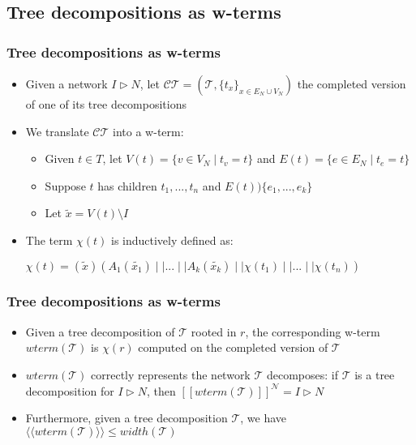 \documentclass{beamer}
\begin{document}
\subsection{Tree decompositions as w-terms}

\begin{frame}
\frametitle{Tree decompositions as w-terms}
	\begin{itemize}
		\item Given a network $I \triangleright N$, 
		let $\mathcal{CT} = (\mathcal{T}, \{ t_x \}_{x \in E_N \cup V_N})$ the completed
		version of one of its tree decompositions
	\medskip
		\item We translate $\mathcal{CT}$ into a w-term:
		\begin{itemize}
			\item Given $t \in T$, let $V(t) = \{ v \in V_N \mid t_v = t \}$ and 
			$E(t) = \{ e \in E_N \mid t_e = t \}$
			\item Suppose $t$ has children $t_1,...,t_n$ and $E(t) ) \{ e_1,...,e_k \}$
			\item Let $\widetilde{x} = V(t) \setminus I$
		\end{itemize}
	\medskip
		\item The term $\chi(t)$ is inductively defined as:
		\begin{center}
			$\chi(t) = (\widetilde{x})(A_1(\widetilde{x_1}) \mid \mid 
			... \mid \mid A_k(\widetilde{x_k}) \mid \mid \chi(t_1) \mid \mid 
			... \mid \mid \chi(t_n))$
		\end{center}
	\end{itemize}
\end{frame}

\begin{frame}
\frametitle{Tree decompositions as w-terms}
\begin{itemize}
	\item Given a tree decomposition of $\mathcal{T}$ rooted in $r$, the corresponding
	w-term $wterm(\mathcal{T})$ is $\chi(r)$ computed on the completed version 
	of $\mathcal{T}$
\medskip
	\item $wterm(\mathcal{T})$ correctly represents the network $\mathcal{T}$ decomposes:
	if $\mathcal{T}$ is a tree decomposition for $I \triangleright N$, then 
	$[\![ wterm(\mathcal{T}) ]\!]^{\mathcal{N}} = I \triangleright N$
\medskip
	\item Furthermore, given a tree decomposition $\mathcal{T}$, we have 
	$\langle \langle wterm(\mathcal{T}) \rangle \rangle \leq width(\mathcal{T})$
	
\end{itemize}
\end{frame}
\end{document}
